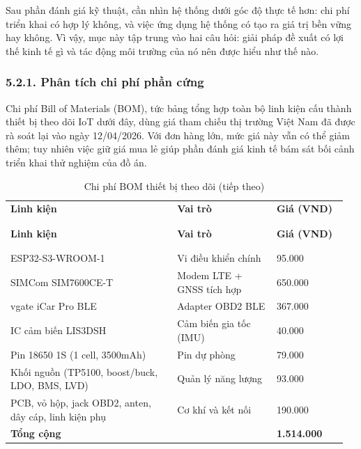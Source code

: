 \documentclass[a4paper]{extarticle}
\newcommand{\thesissettableid}[2]{%
  \renewcommand{\thetable}{#1}%
  \renewcommand{\theHtable}{#2}%
}
\begin{document}
Sau phần đánh giá kỹ thuật, cần nhìn hệ thống dưới góc độ thực tế hơn:
chi phí triển khai có hợp lý không, và việc ứng dụng hệ thống có tạo ra
giá trị bền vững hay không. Vì vậy, mục này tập trung vào hai câu hỏi:
giải pháp đề xuất có lợi thế kinh tế gì và tác động môi trường của nó
nên được hiểu như thế nào.

\subsubsection{5.2.1. Phân tích chi phí phần
cứng}\label{521-phuxe2n-tuxedch-chi-phuxed-phux1ea7n-cux1ee9ng}

Chi phí Bill of Materials (BOM), tức bảng tổng hợp toàn bộ linh kiện cấu
thành thiết bị theo dõi IoT dưới đây, dùng
giá tham chiếu thị trường Việt Nam đã được rà soát lại vào ngày
12/04/2026. Với đơn hàng lớn, mức giá này vẫn có thể giảm thêm; tuy
nhiên việc giữ giá mua lẻ giúp phần đánh giá kinh tế bám sát bối cảnh
triển khai thử nghiệm của đồ án.


{\thesissettableid{5.4}{tab-ch5-chi-phi-bom-thiet-bi-tracker}
\def\LTcaptype{table}
\begin{longtable}{|L{0.479\linewidth}|L{0.282\linewidth}|L{0.204\linewidth}|}
\caption{Chi phí BOM thiết bị theo dõi}\label{tab:ch5-chi-phi-bom-thiet-bi-tracker}\\
\hline \textbf{Linh kiện} & \textbf{Vai trò} & \textbf{Giá (VND)} \\
\\\hline
\endfirsthead
\caption[]{Chi phí BOM thiết bị theo dõi (tiếp theo)}\\
\hline \textbf{Linh kiện} & \textbf{Vai trò} & \textbf{Giá (VND)} \\
\\\hline
\endhead
\\\hline
\endfoot
\endlastfoot
ESP32-S3-WROOM-1 & Vi điều khiển chính & 95.000 \\\hline
SIMCom SIM7600CE-T & Modem LTE + GNSS tích hợp & 650.000 \\\hline
vgate iCar Pro BLE & Adapter OBD2 BLE & 367.000 \\\hline
IC cảm biến LIS3DSH & Cảm biến gia tốc (IMU) & 40.000 \\\hline
Pin 18650 1S (1 cell, 3500mAh) & Pin dự phòng & 79.000 \\\hline
Khối nguồn (TP5100, boost/buck, LDO, BMS, LVD) & Quản lý năng lượng &
93.000 \\\hline
PCB, vỏ hộp, jack OBD2, anten, dây cáp, linh kiện phụ & Cơ khí và kết nối &
190.000 \\\hline
\textbf{Tổng cộng} & & \textbf{1.514.000} \\\hline
\end{longtable}
}
\end{document}
